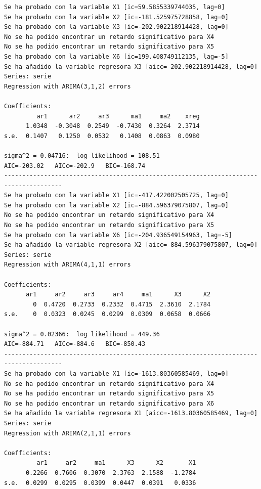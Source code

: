 \documentclass[
  12pt,
  a4paper]{article}
\begin{document}
\begin{verbatim}
Se ha probado con la variable X1 [ic=59.5855339744035, lag=0]
Se ha probado con la variable X2 [ic=-181.525975728858, lag=0]
Se ha probado con la variable X3 [ic=-202.902218914428, lag=0]
No se ha podido encontrar un retardo significativo para X4
No se ha podido encontrar un retardo significativo para X5
Se ha probado con la variable X6 [ic=199.408749112135, lag=-5]
Se ha añadido la variable regresora X3 [aicc=-202.902218914428, lag=0]
Series: serie 
Regression with ARIMA(3,1,2) errors 

Coefficients:
         ar1      ar2     ar3      ma1     ma2    xreg
      1.0348  -0.3048  0.2549  -0.7430  0.3264  2.3714
s.e.  0.1407   0.1250  0.0532   0.1408  0.0863  0.0980

sigma^2 = 0.04716:  log likelihood = 108.51
AIC=-203.02   AICc=-202.9   BIC=-168.74
--------------------------------------------------------------------------------------
Se ha probado con la variable X1 [ic=-417.422002505725, lag=0]
Se ha probado con la variable X2 [ic=-884.596379075807, lag=0]
No se ha podido encontrar un retardo significativo para X4
No se ha podido encontrar un retardo significativo para X5
Se ha probado con la variable X6 [ic=-204.936549154963, lag=-5]
Se ha añadido la variable regresora X2 [aicc=-884.596379075807, lag=0]
Series: serie 
Regression with ARIMA(4,1,1) errors 

Coefficients:
      ar1     ar2     ar3     ar4     ma1      X3      X2
        0  0.4720  0.2733  0.2332  0.4715  2.3610  2.1784
s.e.    0  0.0323  0.0245  0.0299  0.0309  0.0658  0.0666

sigma^2 = 0.02366:  log likelihood = 449.36
AIC=-884.71   AICc=-884.6   BIC=-850.43
--------------------------------------------------------------------------------------
Se ha probado con la variable X1 [ic=-1613.80360585469, lag=0]
No se ha podido encontrar un retardo significativo para X4
No se ha podido encontrar un retardo significativo para X5
No se ha podido encontrar un retardo significativo para X6
Se ha añadido la variable regresora X1 [aicc=-1613.80360585469, lag=0]
Series: serie 
Regression with ARIMA(2,1,1) errors 

Coefficients:
         ar1     ar2     ma1      X3      X2       X1
      0.2266  0.7606  0.3070  2.3763  2.1588  -1.2784
s.e.  0.0299  0.0295  0.0399  0.0447  0.0391   0.0336


\end{verbatim}
\end{document}
